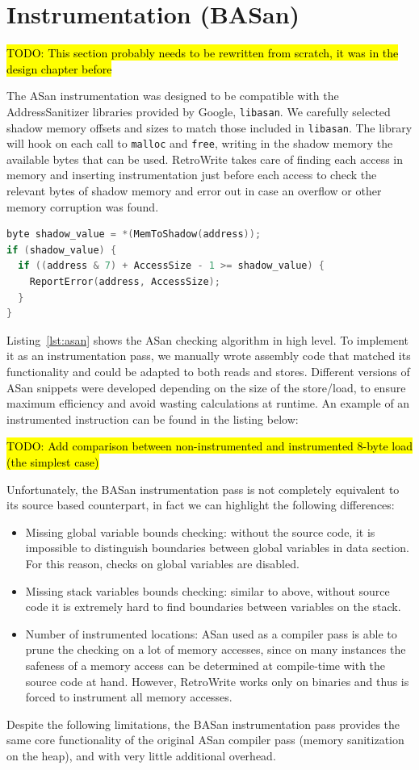 \documentclass[a4paper,11pt,oneside]{report}
\newcommand{\sysname}{RetroWrite\xspace}
\newcommand{\todo}[1]{%
	\begingroup 
	\sethlcolor{cyan}%
	\hl{TODO: #1}%
	\endgroup
}
\begin{document}
\section{Instrumentation (BASan)}
\todo{This section probably needs to be rewritten from scratch, it was in the 
design chapter before}
The ASan instrumentation was designed to be compatible with the 
AddressSanitizer libraries provided by Google, \texttt{libasan}. We carefully 
selected shadow memory offsets and sizes to match those included in 
\texttt{libasan}.  The library will hook on each call to \texttt{malloc} and 
\texttt{free}, writing in the shadow memory the available bytes that can be 
used. \sysname takes care of finding each access in memory and inserting 
instrumentation just before each access to check the relevant bytes of shadow 
memory and error out in case an overflow or other memory corruption was found.


\begin{lstlisting}[language=C,label={lst:asan},caption={ASan checking algorithm 
implemented in C}]
byte shadow_value = *(MemToShadow(address));
if (shadow_value) {
  if ((address & 7) + AccessSize - 1 >= shadow_value) {
	ReportError(address, AccessSize);
  }
}
\end{lstlisting}

Listing~\ref{lst:asan} shows the ASan checking algorithm in high level. To 
implement it as an instrumentation pass, we manually wrote assembly code that 
matched its functionality and could be adapted to both reads and stores.  
Different versions of ASan snippets were developed depending on the size of the 
store/load, to ensure maximum efficiency and avoid wasting calculations at 
runtime. An example of an instrumented instruction can be found in the listing 
below:

\todo{Add comparison between non-instrumented and instrumented 8-byte load (the 
simplest case)}

Unfortunately, the BASan instrumentation pass is not completely equivalent to 
its source based counterpart, in fact we can highlight the following 
differences:
\begin{itemize}
	\item Missing global variable bounds checking: without the source code, it 
		is impossible to distinguish boundaries between global variables in 
		data section. For this reason, checks on global variables are disabled.
	\item Missing stack variables bounds checking: similar to above, without 
		source code it is extremely hard to find boundaries between variables 
		on the stack.
	\item Number of instrumented locations: ASan used as a compiler pass is 
		able to prune the checking on a lot of memory accesses, since on many 
		instances the safeness of a memory access can be determined at 
		compile-time with the source code at hand. However, \sysname works only 
		on binaries and thus is forced to instrument all memory accesses.
\end{itemize}
Despite the following limitations, the BASan instrumentation pass provides the 
same core functionality of the original ASan compiler pass (memory sanitization 
on the heap), and with very little additional overhead.
\end{document}
